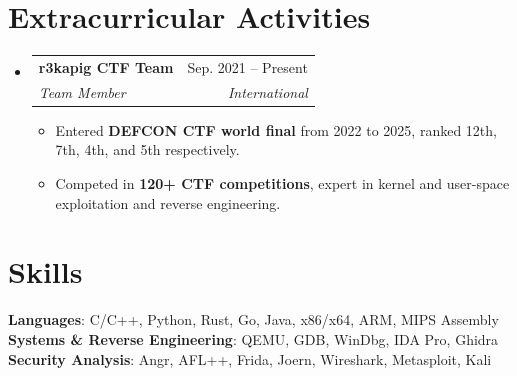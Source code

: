 \documentclass[letterpaper,10pt]{article}
\makeatletter
\newcommand{\resumeItem}[1]{
  \item\small{
    {#1 \vspace{-2pt}}
  }
}
\newcommand{\resumeSubheading}[4]{
  \vspace{-4pt}\item
    \begin{tabular*}{0.97\textwidth}[t]{l@{\extracolsep{\fill}}r}
      \textbf{#1} & #2 \\
      \textit{\small#3} & \textit{\small #4} \\
    \end{tabular*}\vspace{-7pt}
}
\newcommand{\resumeSubHeadingListStart}{\begin{itemize}[leftmargin=0.15in, label={}]}
\newcommand{\resumeSubHeadingListEnd}{\end{itemize}}
\newcommand{\resumeItemListStart}{\begin{itemize}[leftmargin=0.15in]}
\newcommand{\resumeItemListEnd}{\end{itemize}\vspace{-5pt}}
\makeatother
\begin{document}
\section{Extracurricular Activities}
\resumeSubHeadingListStart

\resumeSubheading
{r3kapig CTF Team}{Sep. 2021 -- Present}
{Team Member}{International}
\resumeItemListStart
\resumeItem{
  Entered \textbf{DEFCON CTF world final} from 2022 to 2025, ranked 12th, 7th, 4th, and 5th respectively.
}
\resumeItem{
  Competed in \textbf{120+ CTF competitions}, expert in kernel and user-space exploitation and reverse engineering.
}
\resumeItemListEnd

\resumeSubHeadingListEnd


\section{Skills}
\begin{itemize}[leftmargin=0.15in, label={}]
  \small{\item{
    \textbf{Languages}{: C/C++, Python, Rust, Go, Java, x86/x64, ARM, MIPS Assembly} \\
    \textbf{Systems \& Reverse Engineering}{: QEMU, GDB, WinDbg, IDA Pro, Ghidra} \\
    \textbf{Security Analysis}{: Angr, AFL++, Frida, Joern, Wireshark, Metasploit, Kali} \\
  }}
\end{itemize}

\end{document}
